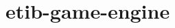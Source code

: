 \chapter{etib-\/game-\/engine}
\hypertarget{md_gui_2ege_2README}{}\label{md_gui_2ege_2README}
\label{md_gui_2ege_2README_autotoc_md203}%
%
